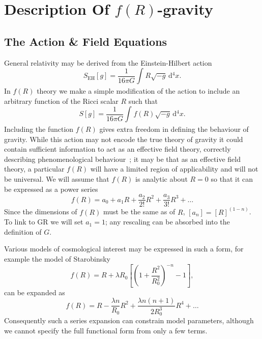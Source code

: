 \documentclass[aps,prd,amsfonts,amssymb,amsmath,nofootinbib,reprint,showpacs]{revtex4-1}
\newcommand{\sub}[1]{\ensuremath{_\text{#1}}}
\newcommand{\dd}{\ensuremath{\text{d}}}
\newcommand{\intd}[4]{\ensuremath{\int_{#1}^{#2}{#3}\,\dd{#4}}}
\newcommand{\recip}[1]{\ensuremath{\frac{1}{#1}}}
\begin{document}
\section{Description Of $f(R)$-gravity}

\subsection{The Action \& Field Equations\label{sec:Action}}

General relativity may be derived from the Einstein-Hilbert action~\cite{Misner1973, Landau1975}
\begin{equation}
S\sub{EH}[g] = \recip{16\pi G}\intd{}{}{R\sqrt{-g}}{^4x}.
\end{equation}
In $f(R)$ theory we make a simple modification of the action to include an arbitrary function of the Ricci scalar $R$ such that~\cite{Buchdahl1970}
\begin{equation}
S[g] = \recip{16\pi G}\intd{}{}{f(R)\sqrt{-g}}{^4x}.
\end{equation}
Including the function $f(R)$ gives extra freedom in defining the behaviour of gravity. While this action may not encode the true theory of gravity it could contain sufficient information to act as an effective field theory, correctly describing phenomenological behaviour~\cite{Park2010}; it may be that as an effective field theory, a particular $f(R)$ will have a limited region of applicability and will not be universal. We will assume that $f(R)$ is analytic about $R = 0$ so that it can be expressed as a power series~\cite{Buchdahl1970, Capozziello2007, Faulkner2007, Clifton2008, Psaltis2008}
\begin{equation}
f(R) = a_0 + a_1 R + \frac{a_2}{2!}R^2 + \frac{a_3}{3!}R^3 + \ldots
\end{equation}
Since the dimensions of $f(R)$ must be the same as of $R$, $[a_n] = [R]^{(1-n)}$. To link to GR we will set $a_1 = 1$; any rescaling can be absorbed into the definition of $G$.

Various models of cosmological interest may be expressed in such a form, for example the model of Starobinsky~\cite{Starobinsky2007}
\begin{equation}
f(R) = R + \lambda R_0 \left[\left(1 + \frac{R^2}{R_0^2}\right)^{-n} - 1\right],
\end{equation}
can be expanded as
\begin{equation}
f(R) = R - \frac{\lambda n}{R_0} R^2 + \frac{\lambda n (n + 1)}{2 R_0^3} R^4 + \ldots
\end{equation}
Consequently such a series expansion can constrain model parameters, although we cannot specify the full functional form from only a few terms.
\end{document}
